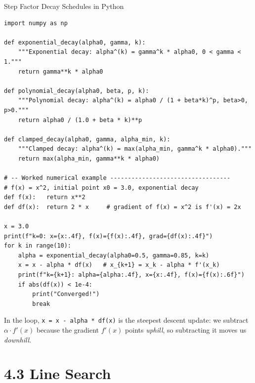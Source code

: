 \documentclass[aspectratio=169,10pt]{beamer}
\begin{document}
\begin{frame}[fragile]{Step Factor Decay Schedules in Python}

\begin{lstlisting}[style=pycode]
import numpy as np

def exponential_decay(alpha0, gamma, k):
    """Exponential decay: alpha^(k) = gamma^k * alpha0, 0 < gamma < 1."""
    return gamma**k * alpha0

def polynomial_decay(alpha0, beta, p, k):
    """Polynomial decay: alpha^(k) = alpha0 / (1 + beta*k)^p, beta>0, p>0."""
    return alpha0 / (1.0 + beta * k)**p

def clamped_decay(alpha0, gamma, alpha_min, k):
    """Clamped decay: alpha^(k) = max(alpha_min, gamma^k * alpha0)."""
    return max(alpha_min, gamma**k * alpha0)

# -- Worked numerical example ----------------------------------
# f(x) = x^2, initial point x0 = 3.0, exponential decay
def f(x):   return x**2
def df(x):  return 2 * x     # gradient of f(x) = x^2 is f'(x) = 2x

x = 3.0
print(f"k=0: x={x:.4f}, f(x)={f(x):.4f}, grad={df(x):.4f}")
for k in range(10):
    alpha = exponential_decay(alpha0=0.5, gamma=0.85, k=k)
    x = x - alpha * df(x)   # x_{k+1} = x_k - alpha * f'(x_k)
    print(f"k={k+1}: alpha={alpha:.4f}, x={x:.4f}, f(x)={f(x):.6f}")
    if abs(df(x)) < 1e-4:
        print("Converged!")
        break
\end{lstlisting}

\medskip
In the loop, \texttt{x = x - alpha * df(x)} is the steepest descent
update: we subtract $\alpha \cdot f'(x)$ because the gradient $f'(x)$
points \emph{uphill}, so subtracting it moves us \emph{downhill}.

\end{frame}

\section{4.3 Line Search}
\end{document}
